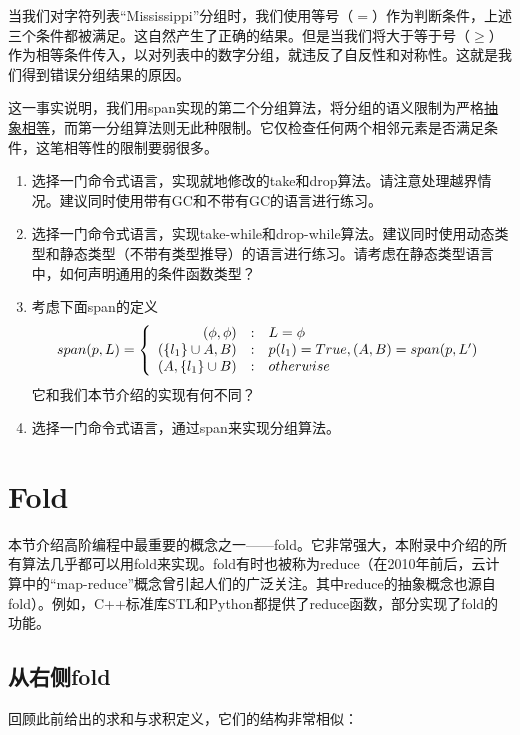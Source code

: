 \documentclass[b5paper]{ctexart}
\begin{document}
当我们对字符列表“Mississippi”分组时，我们使用等号（$=$）作为判断条件，上述三个条件都被满足。这自然产生了正确的结果。但是当我们将大于等于号（$\geq$）作为相等条件传入，以对列表中的数字分组，就违反了自反性和对称性。这就是我们得到错误分组结果的原因。

这一事实说明，我们用span实现的第二个分组算法，将分组的语义限制为严格\underline{抽象相等}，而第一分组算法则无此种限制。它仅检查任何两个相邻元素是否满足条件，这笔相等性的限制要弱很多。

\begin{Exercise}
\begin{enumerate}
\item 选择一门命令式语言，实现就地修改的take和drop算法。请注意处理越界情况。建议同时使用带有GC和不带有GC的语言进行练习。
\item 选择一门命令式语言，实现take-while和drop-while算法。建议同时使用动态类型和静态类型（不带有类型推导）的语言进行练习。请考虑在静态类型语言中，如何声明通用的条件函数类型？
\item 考虑下面span的定义
\[
span(p, L) =  \left \{
  \begin{array}
  {r@{\quad:\quad}l}
  (\phi, \phi) & L = \phi \\
  (\{ l_1 \} \cup A, B) & p(l_1) = True, (A, B) = span(p, L') \\
  (A, \{l_1\} \cup B) & otherwise
  \end{array}
\right.
\]
它和我们本节介绍的实现有何不同？
\item 选择一门命令式语言，通过span来实现分组算法。
\end{enumerate}
\end{Exercise}

\section{Fold}

本节介绍高阶编程中最重要的概念之一——fold。它非常强大，本附录中介绍的所有算法几乎都可以用fold来实现。fold有时也被称为reduce（在2010年前后，云计算中的“map-reduce”概念曾引起人们的广泛关注。其中reduce的抽象概念也源自fold）。例如，C++标准库STL和Python都提供了reduce函数，部分实现了fold的功能。

\subsection{从右侧fold}

回顾此前给出的求和与求积定义，它们的结构非常相似：
\end{document}

